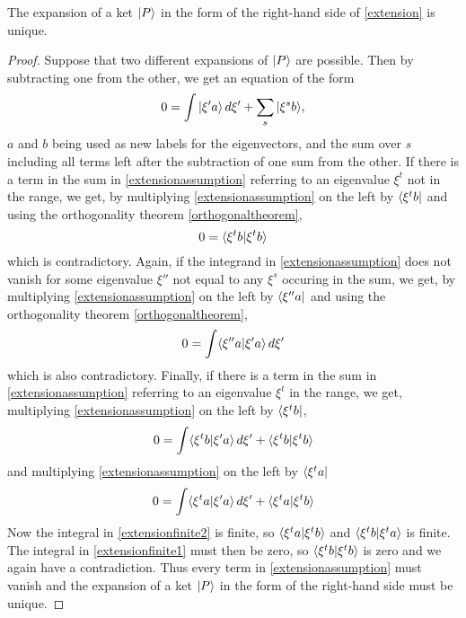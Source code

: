 \begin{theorem}
The expansion of a ket $| P \rangle$ in the form of the right-hand side of \ref{extension} is unique.
\end{theorem}

\begin{proof}
Suppose that two different expansions of $| P \rangle$ are possible. Then by subtracting one from the other, we get an equation of the form
\begin{equation}
0=\int | \xi ' a \rangle \, d\xi' + \sum_s | \xi^s b \rangle,
\label{extensionassumption}
\end{equation}
$a$ and $b$ being used as new labels for the eigenvectors, and the sum
over $s$ including all terms left after the subtraction of one sum from
the other. If there is a term in the sum in \ref{extensionassumption} referring to an eigenvalue $\xi^t$ not in the range, we get, by multiplying \ref{extensionassumption} on the left by $\langle \xi^t b |$ and using the orthogonality theorem \ref{orthogonaltheorem},
\begin{equation*}
0 = \langle \xi^tb | \xi^tb \rangle
\end{equation*}
which is contradictory. Again, if the integrand in \ref{extensionassumption} does not vanish for some eigenvalue $\xi''$ not equal to any $\xi^s$ occuring in the sum, we get, by multiplying \ref{extensionassumption} on the left by $\langle \xi''a |$ and using the orthogonality theorem \ref{orthogonaltheorem},
\begin{equation} 
0=\int \langle \xi''a | \xi' a \rangle\, d\xi'
\end{equation}
which is also contradictory. Finally, if there is a term in the sum in \ref{extensionassumption} referring to an eigenvalue $\xi^t$ in the range, we get, multiplying \ref{extensionassumption} on the left by $\langle \xi^tb |$,
\begin{equation}
0 = \int \langle \xi^tb | \xi'a \rangle \, d\xi' + \langle \xi^tb | \xi^tb \rangle
\label{extensionfinite1}
\end{equation}
and multiplying \ref{extensionassumption} on the left by $\langle \xi^ta |$
\begin{equation}
0 = \int \langle \xi^ta | \xi'a \rangle \, d\xi' + \langle \xi^ta | \xi^tb \rangle
\label{extensionfinite2}
\end{equation}
Now the integral in \ref{extensionfinite2} is finite, so $\langle \xi^ta | \xi^tb \rangle$ and $\langle \xi^tb | \xi^ta \rangle$ is finite. The integral in \ref{extensionfinite1} must then be zero, so $\langle \xi^tb | \xi^tb \rangle$ is zero and we again have a contradiction. Thus every term in \ref{extensionassumption} must vanish and the expansion of a ket $| P \rangle$ in the form of the right-hand side must be unique.

\end{proof}

